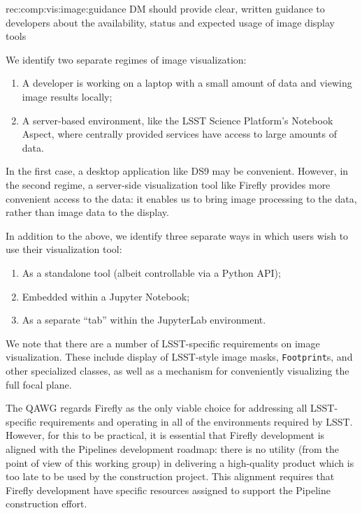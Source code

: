 \begin{recommendation}
  {rec:comp:vis:image:guidance}
  {DM should provide clear, written guidance to developers about the availability, status and expected usage of image display tools}
\end{recommendation}

We identify two separate regimes of image visualization:

\begin{enumerate}

  \item{A developer is working on a laptop with a small amount of data and viewing image results locally;}
  \item{A server-based environment, like the LSST Science Platform's Notebook Aspect, where centrally provided services have access to large amounts of data.}

\end{enumerate}

In the first case, a desktop application like DS9 may be convenient.
However, in the second regime, a server-side visualization tool like Firefly provides more convenient access to the data: it enables us to bring image processing to the data, rather than image data to the display.

In addition to the above, we identify three separate ways in which users wish to use their visualization tool:

\begin{enumerate}

  \item{As a standalone tool (albeit controllable via a Python API);}
  \item{Embedded within a Jupyter Notebook;}
  \item{As a separate ``tab'' within the JupyterLab environment.}

\end{enumerate}

We note that there are a number of LSST-specific requirements on image visualization.
These include display of LSST-style image masks, \texttt{Footprint}s, and other specialized classes, as well as a mechanism for conveniently visualizing the full focal plane.

The QAWG regards Firefly as the only viable choice for addressing all LSST-specific requirements and operating in all of the environments required by LSST.
However, for this to be practical, it is essential that Firefly development is aligned with the Pipelines development roadmap: there is no utility (from the point of view of this working group) in delivering a high-quality product which is too late to be used by the construction project.
This alignment requires that Firefly development have specific resources assigned to support the Pipeline construction effort.


